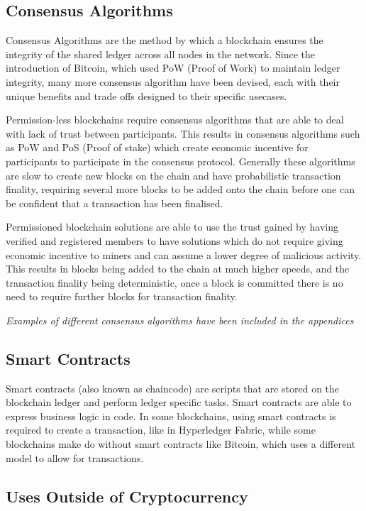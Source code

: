 \subsection{Consensus Algorithms}

Consensus Algorithms are the method by which a blockchain ensures the integrity of the shared ledger across all nodes in the network. Since the introduction of Bitcoin, which used PoW (Proof of Work) to maintain ledger integrity, many more consensus algorithm have been devised, each with their unique benefits and trade offs designed to their specific usecases. 

Permission-less blockchains require consensus algorithms that are able to deal with lack of trust between participants. This results in consensus algorithms such as PoW and PoS (Proof of stake) which create economic incentive for participants to participate in the consensus protocol\cite{buterin2014ethereum}. Generally these algorithms are slow to create new blocks on the chain and have probabilistic transaction finality, requiring several more blocks to be added onto the chain before one can be confident that a transaction has been finalised. 

Permissioned blockchain solutions are able to use the trust gained by having verified and registered members to have solutions which do not require giving economic incentive to miners and can assume a lower degree of malicious activity. This results in blocks being added to the chain at much higher speeds, and the transaction finality being deterministic, once a block is committed there is no need to require further blocks for transaction finality.

\textit{Examples of different consensus algorithms have been included in the appendices}

\subsection{Smart Contracts}

Smart contracts (also known as chaincode) are scripts that are stored on the blockchain ledger and perform ledger specific tasks. Smart contracts are able to express business logic in code. In some blockchains, using smart contracts is required to create a transaction, like in Hyperledger Fabric, while some blockchains make do without smart contracts like Bitcoin, which uses a different model to allow for transactions.\cite{SCIOT}

\subsection{Uses Outside of Cryptocurrency}

